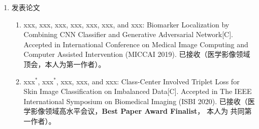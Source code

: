 \begin{enumerate}
	\item {\heiti 发表论文}
	\begin{enumerate}
		\item xxx, xxx, xxx, xxx, xxx, xxx, and xxx: Biomarker Localization by Combining CNN Classifier and Generative Adversarial Network[C]. Accepted in International Conference on Medical Image Computing and Computer Assisted Intervention (MICCAI 2019). {\heiti 已接收（医学影像领域顶会，本人为第一作者）}。
		\item xxx$^*$, xxx$^*$, xxx, xxx, and xxx: Class-Center Involved Triplet Loss  for Skin Image Classification on Imbalanced Data[C]. Accepted in The IEEE International Symposium on Biomedical Imaging (ISBI 2020). {\heiti 已接收（医学影像领域高水平会议}，\textbf{Best Paper Award Finalist}， {\heiti 本人为} {\heiti 共同第一作者）。}
	\end{enumerate}
	
\end{enumerate}
